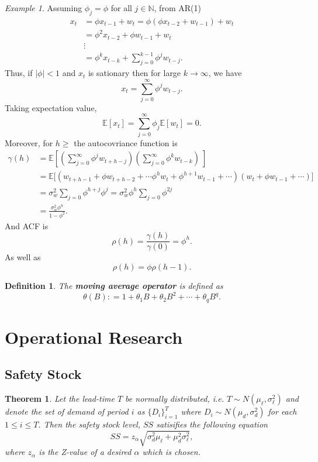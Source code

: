 \documentclass[10pt]{article}
\theoremstyle{remark}
\newtheorem{Example}{Example}[section]
\theoremstyle{plain}
\newtheorem{Theorem}{Theorem}[section]
\newtheorem{Definition}{Definition}[section]
\newcommand{\N}{\mathbb{N}}
\numberwithin{equation}{section}
\renewcommand{\leq}{\leqslant}
\renewcommand{\geq}{\geqslant}
\begin{document}
\begin{Example}
	Assuming  $\phi_j = \phi$ for all $j \in \N$, from AR(1)
	\begin{align*}
		x_t & = \phi x_{t-1} + w_t = \phi(\phi x_{t-2} + w_{t-1}) + w_t\\
		& =  \phi^2 x_{t-2}  + \phi w_{t-1} + w_t\\
		& \vdots\\
		& = \phi^k x_{t-k} + \sum_{j=0}^{k-1} \phi^j w_{t-j}.
	\end{align*}
	Thus, if $|\phi| < 1$ and $x_t$ is sationary then for large $k\to\infty$, we have
	\[
	x_t = \sum_{j=0}^\infty \phi^j w_{t-j}.
	\]
	Taking expectation value,
	\[
	\mathds{E}[x_t] = \sum_{j=0}^\infty	 \phi_j \mathds{E}[w_t] = 0.
	\]
	Moreover, for $h\geq $ the autocovriance function is
	\begin{align*}
		\gamma(h) &= \mathds{E} \left[\left(\sum_{j=0}^\infty \phi^j w_{t+h-j} \right) \left(\sum_{j=0}^\infty \phi^k w_{t-k} \right)\ \right]\\
		& = \mathds{E} \big[(w_{t+h-1}+ \phi w_{t+h-2} + \cdots \phi^h w_{t} + \phi^{h+1} w_{t-1} + \cdots ) (w_t + \phi w_{t-1}+ \cdots)\big]\\
		& = \sigma_w^2 \sum_{j=0} \phi^{h+j} \phi^j = \sigma_w^2 \phi^h \sum_{j=0} \phi^{2j}\\
		& = \frac{\sigma_w^2 \phi^h}{1-\phi^{2}}.
	\end{align*}
	And ACF is
	\[
	\rho(h) = \frac{\gamma(h)}{\gamma(0)} = \phi^h.
	\]
	As well as
	\[
	\rho(h)  =\phi \rho(h-1).
	\]
\end{Example}

\begin{Definition}
	The \textbf{moving average operator} is defined as
	\[
	\theta(B) : = 1 + \theta_1 B + \theta_2 B^2 + \cdots + \theta_q B^q.
	\]
\end{Definition}


%
%
\clearpage
\section{Operational Research}


\subsection{Safety Stock}
\begin{Theorem}
	Let the lead-time $T$ be normally distributed, i.e. $T\sim N(\mu_\ell, \sigma^2_\ell)$ and denote the set of demand of period $i$ as $\{D_i\}_{i=1}^T$ where $D_i \sim N(\mu_d, \sigma^2_d)$ for each $1\leq i \leq T$. Then the safety stock level, $SS$ satisifies the following equation
	\[
	SS = z_\alpha \sqrt{\sigma_d^2 \mu_\ell + \mu_d^2 \sigma^2_\ell},
	\]
	where $z_\alpha$ is the Z-value of a desired $\alpha$ which is chosen.
\end{Theorem}
\end{document}
